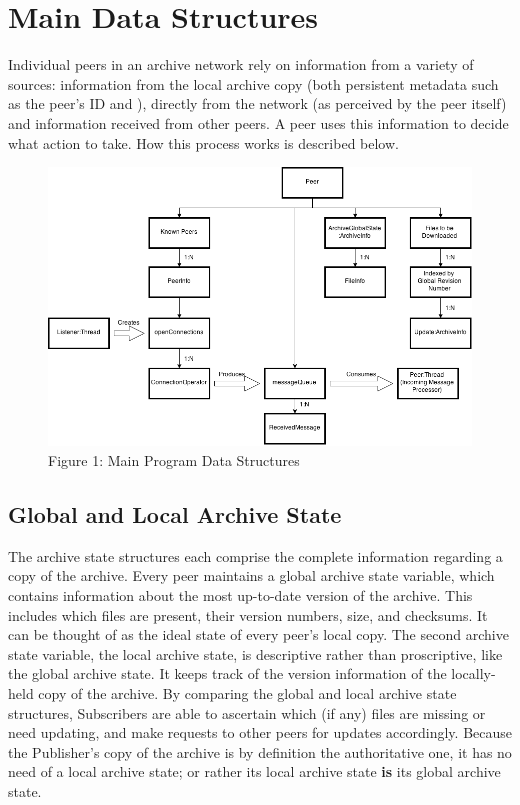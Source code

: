 \documentclass[12pt,a4paper,]{adreport}
\begin{document}
\section{Main Data Structures}\label{main-data-structures}

Individual peers in an archive network rely on information from a
variety of sources: information from the local archive copy (both
persistent metadata such as the peer's ID and ), directly from the
network (as perceived by the peer itself) and information received from
other peers. A peer uses this information to decide what action to take.
How this process works is described below.

\begin{figure}[htbp]
\centering
\includegraphics{strucs.png}
\caption{Figure 1: Main Program Data Structures}
\end{figure}

\subsection{Global and Local Archive
State}\label{global-and-local-archive-state}

The archive state structures each comprise the complete information
regarding a copy of the archive. Every peer maintains a global archive
state variable, which contains information about the most up-to-date
version of the archive. This includes which files are present, their
version numbers, size, and checksums. It can be thought of as the ideal
state of every peer's local copy. The second archive state variable, the
local archive state, is descriptive rather than proscriptive, like the
global archive state. It keeps track of the version information of the
locally-held copy of the archive. By comparing the global and local
archive state structures, Subscribers are able to ascertain which (if
any) files are missing or need updating, and make requests to other
peers for updates accordingly. Because the Publisher's copy of the
archive is by definition the authoritative one, it has no need of a
local archive state; or rather its local archive state \textbf{is} its
global archive state.
\end{document}
